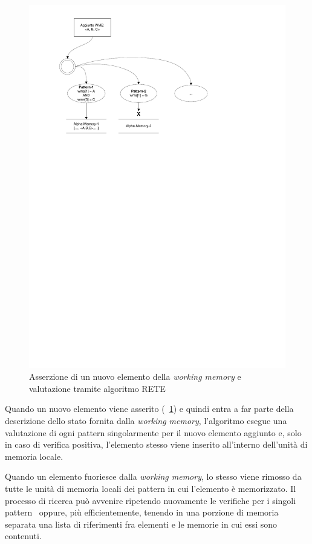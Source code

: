 \begin{figure}[h]
\centering
\includegraphics[viewport=70 545 416 812]{Immagini/Capitolo1/Asserzione.pdf}
\caption{Asserzione di un nuovo elemento della \emph{working memory} e valutazione tramite algoritmo RETE}\label{fig:asserzione}
\end{figure}

Quando un nuovo elemento viene asserito (\figurename~\ref{fig:asserzione}) e quindi entra a far parte della descrizione dello stato fornita dalla \emph{working memory}, l'algoritmo esegue una valutazione di ogni pattern singolarmente per il nuovo elemento aggiunto e, solo in caso di verifica positiva, l'elemento stesso viene inserito all'interno dell'unità di memoria locale.~\cite{forgy1982}

Quando un elemento fuoriesce dalla \emph{working memory}, lo stesso viene rimosso da tutte le unità di memoria locali dei pattern in cui l'elemento è memorizzato. Il processo di ricerca può avvenire ripetendo nuovamente le verifiche per i singoli pattern~\cite{forgy1982} oppure, più efficientemente, tenendo in una porzione di memoria separata una lista di riferimenti fra elementi e le memorie in cui essi sono contenuti.~\cite{Doorenbos95productionmatching}

